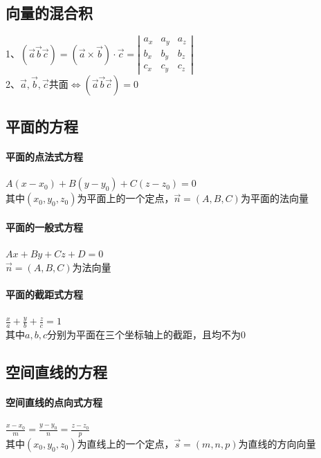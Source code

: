 \documentclass{article}
\begin{document}
\begin{flushleft}
	\subsection{向量的混合积}
	
	1、$(\vec{a}\vec{b}\vec{c})=(\vec{a}\times\vec{b})\cdot\vec{c}=
	\left|\begin{array}{cccc}
	a_x&a_y&a_z\\
	b_x&b_y&b_z\\
	c_x&c_y&c_z
	\end{array}\right|$\\
	2、$\vec{a},\vec{b},\vec{c}$共面$\Leftrightarrow(\vec{a}\vec{b}\vec{c})=0$\\
	
	\subsection{平面的方程}
	
	\paragraph{平面的点法式方程}
	$A(x-x_0)+B(y-y_0)+C(z-z_0)=0$\\
	其中$(x_0,y_0,z_0)$为平面上的一个定点，$\vec{n}=(A,B,C)$为平面的法向量\\
	
	\paragraph{平面的一般式方程}
	$Ax+By+Cz+D=0$\\
	$\vec{n}=(A,B,C)$为法向量\\
	
	\paragraph{平面的截距式方程}
	$\frac{x}{a}+\frac{y}{b}+\frac{z}{c}=1$\\
	其中$a,b,c$分别为平面在三个坐标轴上的截距，且均不为$0$\\
	
	\subsection{空间直线的方程}
	
	\paragraph{空间直线的点向式方程}
	$\frac{x-x_0}{m}=\frac{y-y_0}{n}=\frac{z-z_0}{p}$\\
	其中$(x_0,y_0,z_0)$为直线上的一个定点，$\vec{s}=(m,n,p)$为直线的方向向量\\
	

\end{flushleft}
\end{document}
